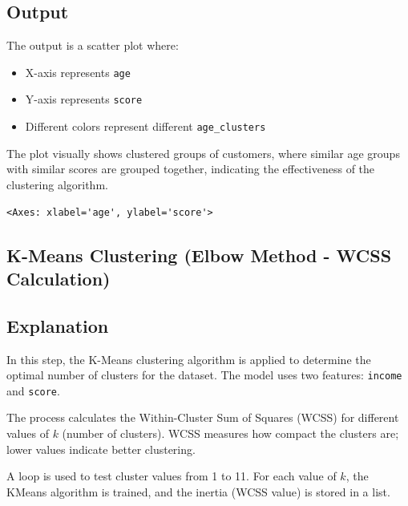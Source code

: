 \documentclass[11pt,a4paper]{report}
\makeatletter
\newcommand{\boxspacing}{\kern\kvtcb@left@rule\kern\kvtcb@boxsep}
\newcommand{\prompt}[4]{
        {\ttfamily\llap{{\color{#2}[#3]:\hspace{3pt}#4}}\vspace{-\baselineskip}}
    }
\makeatother
\begin{document}
\subsection*{Output}
The output is a scatter plot where:
\begin{itemize}
    \item X-axis represents \texttt{age}
    \item Y-axis represents \texttt{score}
    \item Different colors represent different \texttt{age\_clusters}
\end{itemize}

The plot visually shows clustered groups of customers, where similar age groups with similar scores are grouped together, indicating the effectiveness of the clustering algorithm.
\begin{tcolorbox}[breakable, size=fbox, boxrule=.5pt, pad at break*=1mm, opacityfill=0]
\prompt{Out}{outcolor}{27}{\boxspacing}
\begin{Verbatim}[commandchars=\\\{\}]
<Axes: xlabel='age', ylabel='score'>
\end{Verbatim}
\end{tcolorbox}
        
    \begin{center}
    \end{center}
    
\subsection{K-Means Clustering (Elbow Method - WCSS Calculation)}

\subsection*{Explanation}
In this step, the K-Means clustering algorithm is applied to determine the optimal number of clusters for the dataset. The model uses two features: \texttt{income} and \texttt{score}.

The process calculates the Within-Cluster Sum of Squares (WCSS) for different values of \(k\) (number of clusters). WCSS measures how compact the clusters are; lower values indicate better clustering.

A loop is used to test cluster values from 1 to 11. For each value of \(k\), the KMeans algorithm is trained, and the inertia (WCSS value) is stored in a list.
\end{document}
